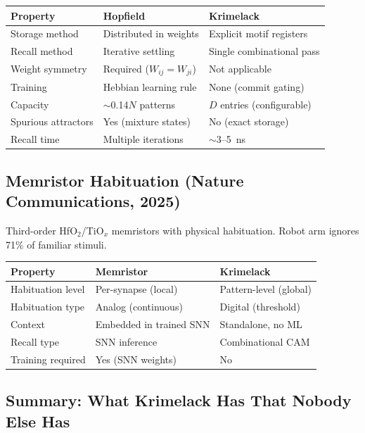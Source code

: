 \documentclass[11pt, a4paper]{article}
\begin{document}
\begin{center}
\begin{tabular}{@{}lll@{}}
\toprule
\textbf{Property} & \textbf{Hopfield} & \textbf{Krimelack} \\
\midrule
Storage method & Distributed in weights & Explicit motif registers \\
Recall method & Iterative settling & Single combinational pass \\
Weight symmetry & Required ($W_{ij} = W_{ji}$) & Not applicable \\
Training & Hebbian learning rule & None (commit gating) \\
Capacity & $\sim$0.14$N$ patterns & $D$ entries (configurable) \\
Spurious attractors & Yes (mixture states) & No (exact storage) \\
Recall time & Multiple iterations & $\sim$3--5~ns \\
\bottomrule
\end{tabular}
\end{center}

\subsection{Memristor Habituation (Nature Communications, 2025)}

Third-order HfO$_2$/TiO$_x$ memristors with physical habituation.
Robot arm ignores 71\% of familiar stimuli.

\begin{center}
\begin{tabular}{@{}lll@{}}
\toprule
\textbf{Property} & \textbf{Memristor} & \textbf{Krimelack} \\
\midrule
Habituation level & Per-synapse (local) & Pattern-level (global) \\
Habituation type & Analog (continuous) & Digital (threshold) \\
Context & Embedded in trained SNN & Standalone, no ML \\
Recall type & SNN inference & Combinational CAM \\
Training required & Yes (SNN weights) & No \\
\bottomrule
\end{tabular}
\end{center}

\subsection{Summary: What Krimelack Has That Nobody Else Has}
\end{document}
